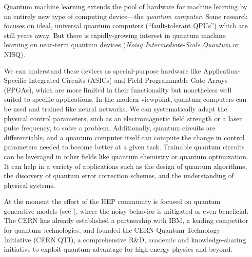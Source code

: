 Quantum machine learning extends the pool of hardware for machine learning by an entirely new type of computing device—the \emph{quantum computer}. Some research focuses on ideal, universal quantum computers (“fault-tolerant QPUs”) which are still years away. But there is rapidly-growing interest in quantum machine learning on near-term quantum devices (\emph{Noisy Intermediate-Scale Quantum} or NISQ).

We can understand these devices as special-purpose hardware like Application-Specific Integrated Circuits (ASICs) and Field-Programmable Gate Arrays (FPGAs), which are more limited in their functionality but nonetheless well suited to specific applications. In the modern viewpoint, quantum computers can be used and trained like neural networks. We can systematically adapt the physical control parameters, such as an electromagnetic field strength or a laser pulse frequency, to solve a problem. Additionally, quantum circuits are differentiable, and a quantum computer itself can compute the change in control parameters needed to become better at a given task. Trainable quantum circuits can be leveraged in other fields like quantum chemistry or quantum optimization. It can help in a variety of applications such as the design of quantum algorithms, the discovery of quantum error correction schemes, and the understanding of physical systems.

At the moment the effort of the HEP community is focused on quantum generative models (see \cite{chan2021quantum}), where the noisy behavior is mitigated or even beneficial. The CERN has already established a partnership with IBM, a leading competitor for quantum technologies, and founded the CERN Quantum Technology Initiative (CERN QTI), a comprehensive R$\&$D, academic and knowledge-sharing initiative to exploit quantum advantage for high-energy physics and beyond. 
